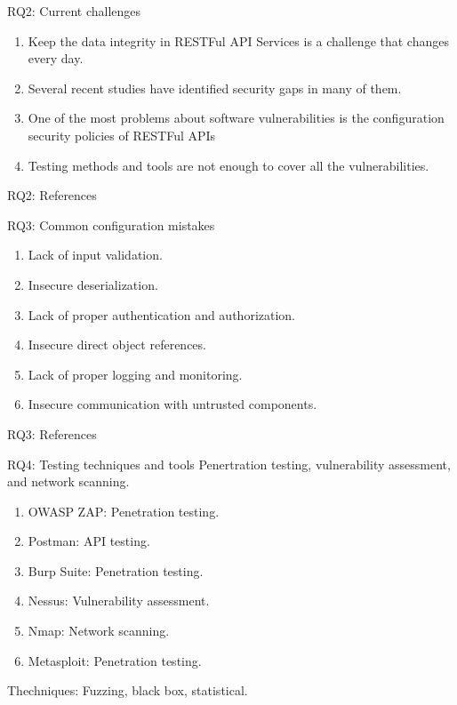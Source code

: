 \documentclass[10pt]{beamer}
\theoremstyle{remark}
\theoremstyle{definition}
\begin{document}
\begin{frame}{RQ2: Current challenges}
  \begin{enumerate}
    \item Keep the data integrity in RESTFul API Services is a challenge that changes every day.
    \item Several recent studies have identified security gaps in many of them.
    \item One of the most problems about software vulnerabilities is the configuration security policies of RESTFul APIs
    \item Testing methods and tools are not enough to cover all the vulnerabilities.
  \end{enumerate}
\end{frame}

\begin{frame}{RQ2: References}
  \printbibliography[keyword={RQ2}]
    \end{frame}

  \begin{frame}{RQ3: Common configuration mistakes}
    \begin{enumerate}
      \item Lack of input validation.
      \item Insecure deserialization.
      \item Lack of proper authentication and authorization.
      \item Insecure direct object references.
      \item Lack of proper logging and monitoring.
        \item Insecure communication with untrusted components.
    \end{enumerate}
  \end{frame}

  \begin{frame}{RQ3: References}
    \printbibliography[keyword={RQ3}]
  \end{frame}

  \begin{frame}{RQ4: Testing techniques and tools}
    Penertration testing, vulnerability assessment, and network scanning. 
    \begin{enumerate}
      \item OWASP ZAP: Penetration testing.
      \item Postman: API testing.
      \item Burp Suite: Penetration testing.
      \item Nessus: Vulnerability assessment.
      \item Nmap: Network scanning.
      \item Metasploit: Penetration testing.
    \end{enumerate}
    Thechniques: Fuzzing, black box, statistical.
  \end{frame}
\end{document}
